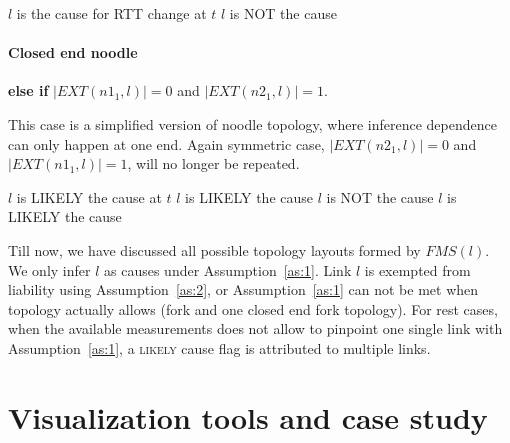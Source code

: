 \begin{algorithmic}
	\State $l$ is the cause for RTT change at $t$ 
\Else
	\State $l$ is NOT the cause
\EndIf
\end{algorithmic}

\paragraph{Closed end noodle} \textbf{else if } $|EXT(n1_1,l)| = 0$ and $|EXT(n2_1,l)| = 1$.

This case is a simplified version of noodle topology, where inference dependence can only happen at one end.
Again symmetric case, $|EXT(n2_1,l)| = 0$ and $|EXT(n1_1,l)| = 1$, will no longer be repeated.

\begin{algorithmic}
	\State $l$ is LIKELY the cause at $t$ 
\Else {}
		\State $l$ is LIKELY the cause 
	\Else
			\State $l$ is NOT the cause 
		\Else
			\State $l$ is LIKELY the cause 
		\EndIf
	\EndIf
\EndIf
\end{algorithmic}

Till now, we have discussed all possible topology layouts formed by $FMS(l)$. We only infer $l$ as causes under Assumption~\ref{as:1}. Link $l$ is exempted from liability using Assumption~\ref{as:2}, or Assumption~\ref{as:1} can not be met when topology actually allows (fork and one closed end fork topology). For rest cases, when the available measurements does not allow to pinpoint one single link with Assumption~\ref{as:1}, a \textsc{likely} cause flag is attributed to multiple links.

\section{Visualization tools and case study}
